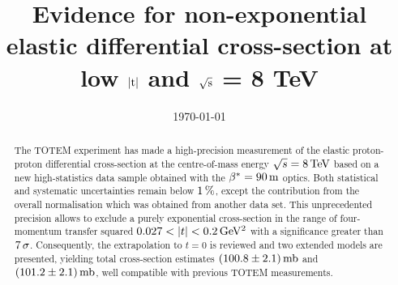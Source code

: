 \documentclass[pdftex,twocolumn,epjc3]{svjour3}
\def\un#1{\,{\rm #1}}
\begin{document}
\title{Evidence for non-exponential elastic differential cross-section at low $|\hbox{t}|$ and $\sqrt{\hbox{s}}$ = 8 TeV} %




\date{\today}

\maketitle

\begin{abstract}
The TOTEM experiment has made a high-precision measurement of the elastic 
proton-proton differential cross-section at the centre-of-mass energy 
$\sqrt s = 8\un{TeV}$ based on a new high-statistics data sample obtained with 
the $\beta^* = 90\un{m}$ optics. 
Both statistical and systematic uncertainties remain below $1\un{\%}$, except 
the contribution from the overall normalisation which was obtained from 
another data set. This unprecedented precision allows to exclude a purely exponential cross-section in the range of four-momentum transfer squared $0.027 < |t| < 0.2\un{GeV^2}$ with a significance greater than $7\un{\sigma}$. Consequently, the extrapolation to $t=0$ is reviewed and two extended models are presented, yielding total cross-section estimates $(100.8 \pm 2.1)\un{mb}$ and $(101.2 \pm 2.1)\un{mb}$, well compatible with previous TOTEM measurements.
%


\end{abstract}
\end{document}

